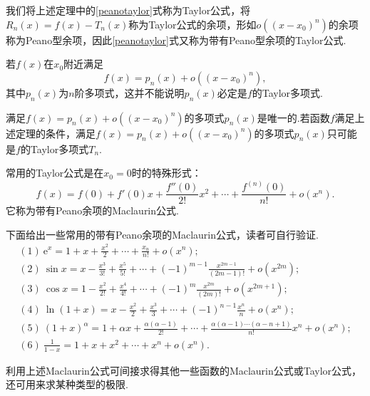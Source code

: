 我们将上述定理中的\ref{peanotaylor}式称为{\heiti Taylor公式}，将$R_n(x)=f(x)-T_n(x)$称为Taylor公式的{\heiti 余项}，形如$o((x-x_0)^n)$的余项称为{\heiti Peano型余项}，因此\ref{peanotaylor}式又称为{\heiti 带有Peano型余项的Taylor公式}.\\
\begin{remark}
	若$f(x)$在$x_0$附近满足
	$$f(x)=p_n(x)+o((x-x_0)^n),$$
	其中$p_n(x)$为$n$阶多项式，这并不能说明$p_n(x)$必定是$f$的Taylor多项式.
\end{remark}
\begin{remark}
	满足$f(x)=p_n(x)+o((x-x_0)^n)$的多项式$p_n(x)$是唯一的.若函数$f$满足上述定理的条件，满足$f(x)=p_n(x)+o((x-x_0)^n)$的多项式$p_n(x)$只可能是$f$的Taylor多项式$T_n$.
\end{remark}
常用的Taylor公式是在$x_0=0$时的特殊形式：
$$f(x)=f(0)+f'(0)x+\frac{f''(0)}{2!}x^2+\cdots+\frac{f^{(n)}(0)}{n!}+o(x^n).$$
它称为带有Peano余项的{\heiti Maclaurin公式}.

下面给出一些常用的带有Peano余项的Maclaurin公式，读者可自行验证.
\begin{align*}
	&(1)\ \text{e}^x=1+x+\frac{x^2}{2}+\cdots+\frac{x_n}{n!}+o(x^n);\\
	&(2)\ \sin x=x-\frac{x^3}{3!}+\frac{x^5}{5!}+\cdots+(-1)^{m-1}\frac{x^{2m-1}}{(2m-1)!}+o(x^{2m});\\
	&(3)\ \cos x=1-\frac{x^2}{2!}+\frac{x^4}{4!}+\cdots+(-1)^m\frac{x^{2m}}{(2m)!}+o(x^{2m+1});\\
	&(4)\ \ln(1+x)=x-\frac{x^2}{2}+\frac{x^3}{3}+\cdots+(-1)^{n-1}\frac{x^n}{n}+o(x^n);\\
	&(5)\ (1+x)^\alpha=1+\alpha x+\frac{\alpha(\alpha-1)}{2!}+\cdots+\frac{\alpha(\alpha-1)\cdots(\alpha-n+1)}{n!}x^n+o(x^n);\\
	&(6)\ \frac{1}{1-x}=1+x+x^2+\cdots+x^n+o(x^n).&
\end{align*}

利用上述Maclaurin公式可间接求得其他一些函数的Maclaurin公式或Taylor公式，还可用来求某种类型的极限.

